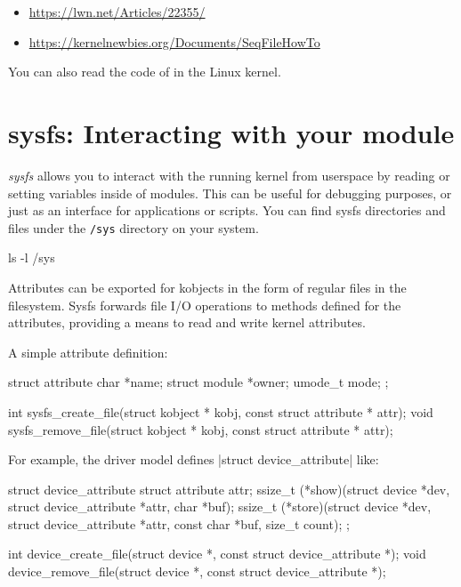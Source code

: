 \documentclass[10pt, oneside]{book}
\begin{document}
\begin{itemize}
  \item \url{https://lwn.net/Articles/22355/}
  \item \url{https://kernelnewbies.org/Documents/SeqFileHowTo}
\end{itemize}

You can also read the code of  in the Linux kernel.

\section{sysfs: Interacting with your module}
\label{sec:sysfs}
\emph{sysfs} allows you to interact with the running kernel from userspace by reading or setting variables inside of modules.
This can be useful for debugging purposes, or just as an interface for applications or scripts.
You can find sysfs directories and files under the \verb|/sys| directory on your system.

\begin{codebash}
ls -l /sys
\end{codebash}

Attributes can be exported for kobjects in the form of regular files in the filesystem.
Sysfs forwards file I/O operations to methods defined for the attributes, providing a means to read and write kernel attributes.

A simple attribute definition:

\begin{code}
struct attribute {
    char *name;
    struct module *owner;
    umode_t mode;
};

int sysfs_create_file(struct kobject * kobj, const struct attribute * attr);
void sysfs_remove_file(struct kobject * kobj, const struct attribute * attr);
\end{code}

For example, the driver model defines \cpp|struct device_attribute| like:

\begin{code}
struct device_attribute {
    struct attribute attr;
    ssize_t (*show)(struct device *dev, struct device_attribute *attr,
                    char *buf);
    ssize_t (*store)(struct device *dev, struct device_attribute *attr,
                    const char *buf, size_t count);
};

int device_create_file(struct device *, const struct device_attribute *);
void device_remove_file(struct device *, const struct device_attribute *);
\end{code}
\end{document}
